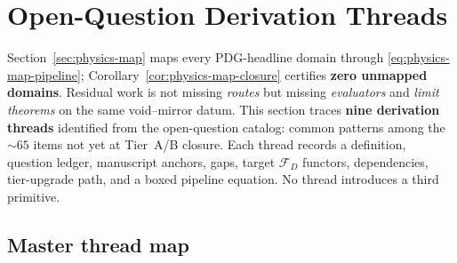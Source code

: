 \section{Open-Question Derivation Threads}
\label{sec:open-threads}

Section~\ref{sec:physics-map} maps every PDG-headline domain through
\eqref{eq:physics-map-pipeline}; Corollary~\ref{cor:physics-map-closure}
certifies \textbf{zero unmapped domains}. Residual work is not missing
\emph{routes} but missing \emph{evaluators} and \emph{limit theorems} on the
same void--mirror datum. This section traces \textbf{nine derivation threads}
identified from the open-question catalog: common patterns among the
$\sim 65$ items not yet at Tier~A/B closure. Each thread records a definition,
question ledger, manuscript anchors, gaps, target $\mathcal{F}_D$ functors,
dependencies, tier-upgrade path, and a boxed pipeline equation. No thread
introduces a third primitive.

\subsection{Master thread map}
\label{sec:open-threads:map}

